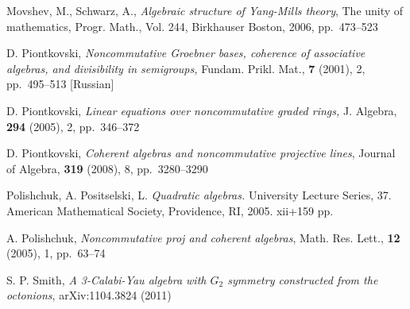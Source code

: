 \documentclass{amsart}
\numberwithin{equation}{section}
\theoremstyle{plain}
\theoremstyle{definition}
\begin{document}
\begin{thebibliography}{Biblio}
Movshev, M., Schwarz, A., {\em Algebraic structure of Yang-Mills theory}, The unity of mathematics, Progr.
Math., Vol. 244, Birkhauser Boston, 2006, pp.~473--523
 

 D. Piontkovski, {\it Noncommutative Groebner bases,
          coherence of associative algebras, and divisibility
                 in semigroups,} Fundam. Prikl. Mat.,
           {\bf 7} (2001), 2, pp.~495--513 [Russian]

 D. Piontkovski, {\it Linear equations over noncommutative graded rings,}
            J. Algebra,  {\bf 294}  (2005),  2, pp.~346--372

	D. Piontkovski, {\it Coherent algebras and noncommutative projective lines},
Journal of Algebra, {\bf 319} (2008), 8, pp.~3280--3290

 Polishchuk, A. Positselski, L. {\em Quadratic algebras.} University Lecture Series, 37. American Mathematical Society, Providence, RI, 2005. xii+159 pp.

 A. Polishchuk, {\it Noncommutative proj and coherent algebras},
  Math. Res. Lett., {\bf   12}  (2005),  1, pp.~63--74

 S. P. Smith, {\em A 3-Calabi-Yau algebra with $G_2$ symmetry constructed from the octonions},  	arXiv:1104.3824 (2011)

\end{thebibliography}
\end{document}
